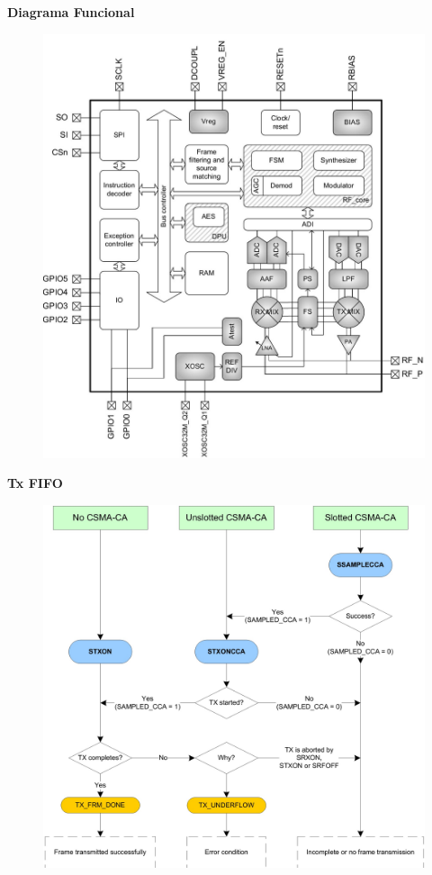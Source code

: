 \documentclass[aspectratio=169]{beamer}
\begin{document}
\begin{frame}{\textbf{Diagrama Funcional}}

	\begin{figure}[H]
		\includegraphics[height=1\textheight]{./imagenes/diagrama.jpg}
	\end{figure}	

\end{frame}

\begin{frame}{\textbf{Tx FIFO}}

	\begin{figure}[H]
		\includegraphics[height=1\textheight]{./imagenes/txfifo.jpg}
	\end{figure}	

\end{frame}
\end{document}

